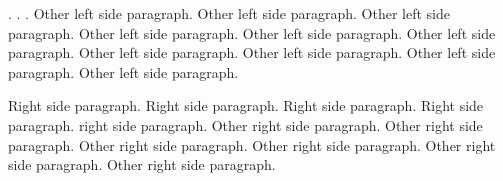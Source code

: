 \documentclass{article}
\begin{document}
\makeatletter

\makeatother

\begin{pages}
    \begin{Leftside}
        \beginnumbering
            \pstart
                  . . .
            \pend
            \pstart
                Other left side paragraph.  Other left side paragraph.  Other left side paragraph.  Other left side paragraph.  Other left side paragraph.  Other left side paragraph.  Other left side paragraph.  Other left side paragraph.  Other left side paragraph.  Other left side paragraph.
            \pend
        \endnumbering
    \end{Leftside}
    \begin{Rightside}
        \beginnumbering
            \pstart
                 Right side paragraph. Right side paragraph. Right side paragraph. Right side paragraph.
            \pend
            \pstart
                 right side paragraph. Other right side paragraph. Other right side paragraph. Other right side paragraph. Other right side paragraph. Other right side paragraph. Other right side paragraph.
            \pend
        \endnumbering
    \end{Rightside}

\end{pages} 
\Pages
\end{document}
